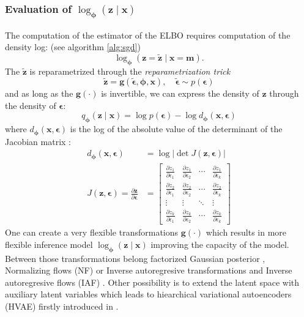 \subsubsection{Evaluation of $\log_{\boldsymbol{\phi}}(\boldsymbol{z}\mid \boldsymbol{x})$}
\label{subsubsec:log_q}
The computation of the estimator of the ELBO requires computation of the density log: (see algorithm \ref{alg:sgd})
$$
\log_{\boldsymbol{\phi}}(\boldsymbol{z}=\tilde{\boldsymbol{z}}\mid \boldsymbol{x}=\boldsymbol{m}).
$$ 
The $\tilde{\boldsymbol{z}}$ is reparametrized through the \textit{reparametrization trick}
$$
\tilde{\boldsymbol{z}} = \mathbf{g}(\tilde{\boldsymbol{\epsilon}},{\boldsymbol{\phi}},\mathbf{x}),\quad \tilde{\boldsymbol{\epsilon}} \sim p(\boldsymbol{\epsilon})
$$
and as long as the $\mathbf{g}(\cdot)$ is invertible, we can express the density of $\boldsymbol{z}$ through the density of $\boldsymbol{\epsilon}$:
$$
q_{\boldsymbol{\phi}}(\mathbf{z}\mid \mathbf{x}) = \log p(\boldsymbol{\epsilon}) - \log d_{\boldsymbol{\phi}}(\boldsymbol{x},\boldsymbol{\epsilon})
$$
where $d_{\boldsymbol{\phi}}(\boldsymbol{x},\boldsymbol{\epsilon})$ is the log of the absolute value of the determinant of the Jacobian 
matrix \cite{intro-vae-2019}:
\begin{align*}
d_{\boldsymbol{\phi}}(\boldsymbol{x},\boldsymbol{\epsilon}) &= \log |\det J(\boldsymbol{z}, \boldsymbol{\epsilon})|\\
J(\boldsymbol{z}, \boldsymbol{\epsilon}) = \frac{\partial \boldsymbol{z}}{\partial \boldsymbol{\epsilon}} &=
\begin{bmatrix}
\frac{\partial z_1}{\partial \epsilon_1} & \frac{\partial z_1}{\partial \epsilon_2} & \cdots & \frac{\partial z_1}{\partial \epsilon_k} \\
\frac{\partial z_2}{\partial \epsilon_1} & \frac{\partial z_2}{\partial \epsilon_2} & \cdots & \frac{\partial z_2}{\partial \epsilon_k} \\
\vdots & \vdots & \ddots & \vdots \\
\frac{\partial z_k}{\partial \epsilon_1} & \frac{\partial z_k}{\partial \epsilon_2} & \cdots & \frac{\partial z_k}{\partial \epsilon_k}
\end{bmatrix}
\end{align*}
One can create a very flexible transformations $\boldsymbol{g}(\cdot)$ which results in more flexible inference model 
$\log_{\boldsymbol{\phi}}(\boldsymbol{z}\mid\boldsymbol{x})$ improving the capacity of the model. Between those transformations
belong factorized Gaussian posterior \cite{intro-vae-2019}, Normalizing flows (NF) \cite{nf-2015} or Inverse autoregresive transformations and 
Inverse autoregresive flows (IAF) \cite{iaf-2016}. Other possibility is to extend the latent space with auxiliary latent variables
\cite{aux-var-2016} which leads to hiearchical variational autoencoders (HVAE) firstly introduced in \cite{lvae-2016}.

